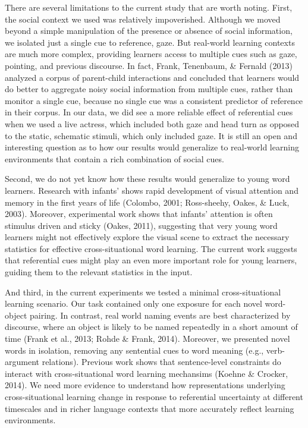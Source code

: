 \documentclass[authoryear, review]{elsarticle}
\begin{document}
There are several limitations to the current study that are worth
noting. First, the social context we used was relatively impoverished.
Although we moved beyond a simple manipulation of the presence or
absence of social information, we isolated just a single cue to
reference, gaze. But real-world learning contexts are much more complex,
providing learners access to multiple cues such as gaze, pointing, and
previous discourse. In fact, Frank, Tenenbaum, \& Fernald (2013)
analyzed a corpus of parent-child interactions and concluded that
learners would do better to aggregate noisy social information from
multiple cues, rather than monitor a single cue, because no single cue
was a consistent predictor of reference in their corpus. In our data, we
did see a more reliable effect of referential cues when we used a live
actress, which included both gaze and head turn as opposed to the
static, schematic stimuli, which only included gaze. It is still an open
and interesting question as to how our results would generalize to
real-world learning environments that contain a rich combination of
social cues.

Second, we do not yet know how these results would generalize to young
word learners. Research with infants' shows rapid development of visual
attention and memory in the first years of life (Colombo, 2001;
Ross-sheehy, Oakes, \& Luck, 2003). Moreover, experimental work shows
that infants' attention is often stimulus driven and sticky (Oakes,
2011), suggesting that very young word learners might not effectively
explore the visual scene to extract the necessary statistics for
effective cross-situational word learning. The current work suggests
that referential cues might play an even more important role for young
learners, guiding them to the relevant statistics in the input.

And third, in the current experiments we tested a minimal
cross-situational learning scenario. Our task contained only one
exposure for each novel word-object pairing. In contrast, real world
naming events are best characterized by discourse, where an object is
likely to be named repeatedly in a short amount of time (Frank et al.,
2013; Rohde \& Frank, 2014). Moreover, we presented novel words in
isolation, removing any sentential cues to word meaning (e.g.,
verb-argument relations). Previous work shows that sentence-level
constraints do interact with cross-situational word learning mechansims
(Koehne \& Crocker, 2014). We need more evidence to understand how
representations underlying cross-situational learning change in response
to referential uncertainty at different timescales and in richer
language contexts that more accurately reflect learning environments.
\end{document}
